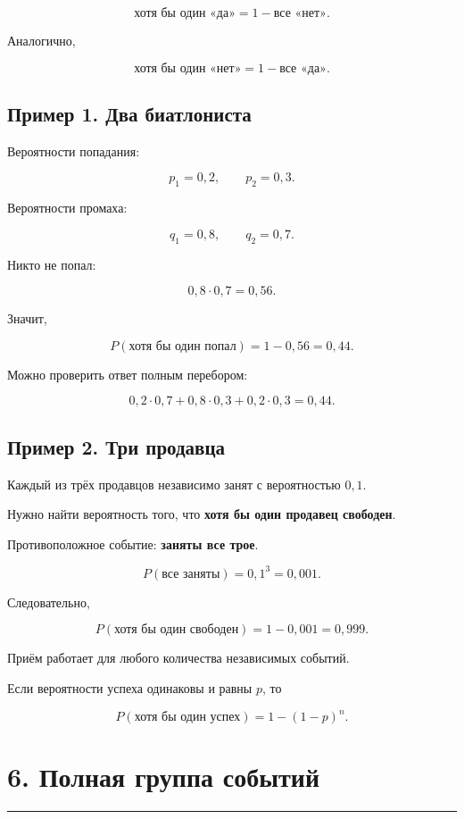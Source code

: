 \documentclass[a4paper,12pt]{article}
\newcommand{\accentline}{%
    \vspace{0.3em}
    {\color{accent}\rule{\linewidth}{0.7pt}}
    \vspace{0.5em}
}
\newcommand{\important}[1]{\textbf{\color{darkaccent}#1}}
\begin{document}
\[
\boxed{
\text{хотя бы один «да»}
=
1-\text{все «нет»}
}.
\]

Аналогично,

\[
\boxed{
\text{хотя бы один «нет»}
=
1-\text{все «да»}
}.
\]

\subsection*{Пример 1. Два биатлониста}

Вероятности попадания:

\[
p_1=0,2,
\qquad
p_2=0,3.
\]

Вероятности промаха:

\[
q_1=0,8,
\qquad
q_2=0,7.
\]

Никто не попал:

\[
0,8\cdot0,7=0,56.
\]

Значит,

\[
P(\text{хотя бы один попал})
=
1-0,56
=
0,44.
\]

Можно проверить ответ полным перебором:

\[
0,2\cdot0,7
+
0,8\cdot0,3
+
0,2\cdot0,3
=
0,44.
\]

\subsection*{Пример 2. Три продавца}

Каждый из трёх продавцов независимо занят с вероятностью $0,1$.

Нужно найти вероятность того, что \important{хотя бы один продавец свободен}.

Противоположное событие: \important{заняты все трое}.

\[
P(\text{все заняты})
=
0,1^3
=
0,001.
\]

Следовательно,

\[
P(\text{хотя бы один свободен})
=
1-0,001
=
0,999.
\]

Приём работает для любого количества независимых событий.

Если вероятности успеха одинаковы и равны $p$, то

\[
\boxed{
P(\text{хотя бы один успех})
=
1-(1-p)^n
}.
\]


\section*{\color{darkaccent}6. Полная группа событий}
\accentline
\end{document}
